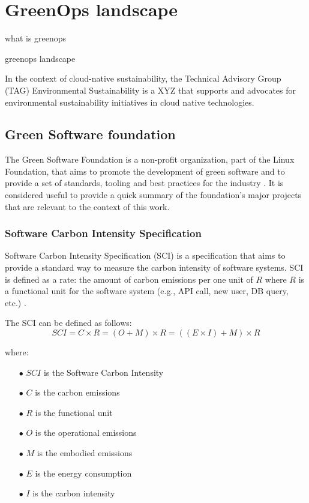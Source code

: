 \section{GreenOps landscape}

what is greenops

greenops landscape 

In the context of cloud-native sustainability,
the Technical Advisory Group (TAG) Environmental Sustainability is a XYZ that supports and advocates for environmental sustainability initiatives in cloud native technologies.



\subsection{Green Software foundation}

The Green Software Foundation is a non-profit organization, part of the Linux Foundation, that aims to promote the development of green software and to provide a set of standards, tooling and best practices for the industry \cite{green_software_foundation}.
It is considered useful to provide a quick summary of the foundation's major projects that are relevant to the context of this work.

\subsubsection{Software Carbon Intensity Specification}

Software Carbon Intensity Specification (SCI) is a specification that aims to provide a standard way to measure the carbon intensity of software systems.
SCI is defined as a rate: the amount of carbon emissions per one unit of $R$ where $R$ is a functional unit for the software system (e.g., API call, new user, DB query, etc.) \cite{sci}.

The SCI can be defined as follows:
\[
SCI = C \times R = (O + M) \times R = ((E \times I) + M) \times R
\]

where:
\begin{itemize}[itemsep=0.2pt, topsep=1pt]
    \item[$\bullet$] $SCI$ is the Software Carbon Intensity
    \item[$\bullet$] $C$ is the carbon emissions
    \item[$\bullet$] $R$ is the functional unit
    \item[$\bullet$] $O$ is the operational emissions
    \item[$\bullet$] $M$ is the embodied emissions
    \item[$\bullet$] $E$ is the energy consumption
    \item[$\bullet$] $I$ is the carbon intensity
\end{itemize}

